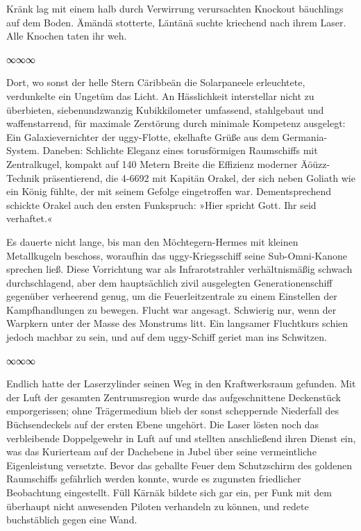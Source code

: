 Kränk lag mit einem halb durch Verwirrung verursachten Knockout bäuchlings auf dem Boden. Ämändä stotterte, Läntänä suchte kriechend nach ihrem Laser. Alle Knochen taten ihr weh.

\begin{center}
	∞∞∞
\end{center}

Dort, wo sonst der helle Stern Cäribbeän die Solarpaneele erleuchtete, verdunkelte ein Ungetüm das Licht. An Hässlichkeit interstellar nicht zu überbieten, siebenundzwanzig Kubikkilometer umfassend, stahlgebaut und waffenstarrend, für maximale Zerstörung durch minimale Kompetenz ausgelegt: Ein Galaxievernichter der uggy-Flotte, ekelhafte Grüße aus dem Germania-System. Daneben: Schlichte Eleganz eines torusförmigen Raumschiffs mit Zentralkugel, kompakt auf 140 Metern Breite die Effizienz moderner Äöüzz-Technik präsentierend, die 4-6692 mit Kapitän Orakel, der sich neben Goliath wie ein König fühlte, der mit seinem Gefolge eingetroffen war. Dementsprechend schickte Orakel auch den ersten Funkspruch: »Hier spricht Gott. Ihr seid verhaftet.«

Es dauerte nicht lange, bis man den Möchtegern-Hermes mit kleinen Metallkugeln beschoss, woraufhin das uggy-Kriegsschiff seine Sub-Omni-Kanone sprechen ließ. Diese Vorrichtung war als Infrarotstrahler verhältnismäßig schwach durchschlagend, aber dem hauptsächlich zivil ausgelegten Generationenschiff gegenüber verheerend genug, um die Feuerleitzentrale zu einem Einstellen der Kampfhandlungen zu bewegen. Flucht war angesagt. Schwierig nur, wenn der Warpkern unter der Masse des Monstrums litt. Ein langsamer Fluchtkurs schien jedoch machbar zu sein, und auf dem uggy-Schiff geriet man ins Schwitzen.

\begin{center}
	∞∞∞
\end{center}

Endlich hatte der Laserzylinder seinen Weg in den Kraftwerksraum gefunden. Mit der Luft der gesamten Zentrumsregion wurde das aufgeschnittene Deckenstück emporgerissen; ohne Trägermedium blieb der sonst scheppernde Niederfall des Büchsendeckels auf der ersten Ebene ungehört. Die Laser lösten noch das verbleibende Doppelgewehr in Luft auf und stellten anschließend ihren Dienst ein, was das Kurierteam auf der Dachebene in Jubel über seine vermeintliche Eigenleistung versetzte. Bevor das geballte Feuer dem Schutzschirm des goldenen Raumschiffs gefährlich werden konnte, wurde es zugunsten friedlicher Beobachtung eingestellt. Füll Kärnäk bildete sich gar ein, per Funk mit dem überhaupt nicht anwesenden Piloten verhandeln zu können, und redete buchstäblich gegen eine Wand.

